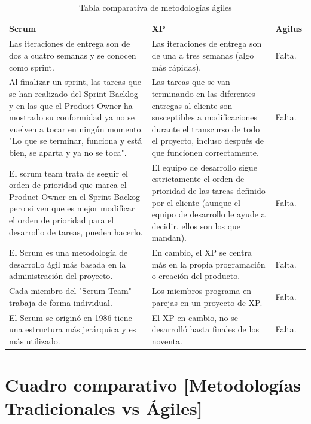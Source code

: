 \begin{table}[H]	
\begin{center}
\begin{tabular}{ | m{4cm} | m{4cm}| m{4cm}| } 
 \hline
 Scrum & XP & Agilus \\
 \hline
 Las iteraciones de entrega son de dos a cuatro semanas y se conocen como sprint. 
 &
 Las iteraciones de entrega son de una a tres semanas (algo más rápidas). 
 & 
 Falta.\\
 \hline
 Al finalizar un sprint, las tareas que se han realizado del Sprint Backlog y en las que el Product Owner ha mostrado su conformidad ya no se vuelven a tocar en ningún momento. "Lo que se terminar, funciona y está bien, se aparta y ya no se toca".
 & 
 Las tareas que se van terminando en las diferentes entregas al cliente son susceptibles a modificaciones durante el transcurso de todo el proyecto, incluso después de que funcionen correctamente.
 & 
 Falta.\\
 \hline
 El scrum team trata de seguir el orden de prioridad que marca el Product Owner en el Sprint Backog pero si ven que es mejor modificar el orden de prioridad para el desarrollo de tareas, pueden hacerlo.
 & 
 El equipo de desarrollo sigue estrictamente el orden de prioridad de las tareas definido por el cliente (aunque el equipo de desarrollo le ayude a decidir, ellos son los que mandan).
 & 
 Falta.\\
 \hline
 El Scrum es una metodología de desarrollo ágil más basada en la administración del proyecto.
 & 
 En cambio, el XP se centra más en la propia programación o creación del producto.
 & 
 Falta.\\
 \hline
 Cada miembro del "Scrum Team" trabaja de forma individual.
 & 
 Los miembros programa en parejas en un proyecto de XP.
 & 
 Falta.\\
 \hline
 El Scrum se originó en 1986 tiene una estructura más jerárquica y es más utilizado.
 & 
 El XP en cambio, no se desarrolló hasta finales de los noventa.
 & 
 Falta.\\
 \hline
\end{tabular}
\caption{Tabla comparativa de metodologías ágiles}
\label{Tabla:2}
\end{center}
\end{table}	







\section{Cuadro comparativo [Metodologías Tradicionales vs Ágiles]} 


